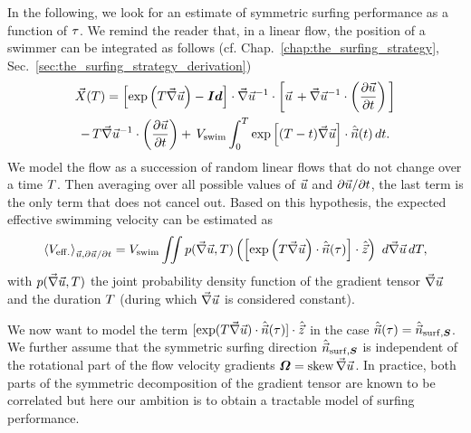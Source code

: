 In the following, we look for an estimate of symmetric surfing performance as a function of $\tau$.
We remind the reader that, in a linear flow, the position of a swimmer can be integrated as follows (cf. Chap.~\ref{chap:the_surfing_strategy}, Sec.~\ref{sec:the_surfing_strategy_derivation})
\begin{multline}
	\vec{X}(T) =
	\left[ \exp \left( T \vec{\nabla} \vec{u} \right) - \boldsymbol{Id} \right] \cdot \vec{\nabla} \vec{u}^{-1} \cdot \left[ \vec{u} \, + \vec{\nabla} \vec{u}^{-1} \cdot \left(\frac{\partial \vec{u}}{\partial t} \right) \, \right] \\
	- \, T \vec{\nabla} \vec{u}^{-1} \cdot \left(\frac{\partial \vec{u}}{\partial t} \right)
	+ \, V_{\mathrm{swim}} \int_{0}^{T} \exp \left[ (T - t) \vec{\nabla} \vec{u} \right] \cdot\hat{\vec{n}}(t) \, dt.
\end{multline}
We model the flow as a succession of random linear flows that do not change over a time $T$.
Then averaging over all possible values of $\vec{u}$ and $\partial \vec{u} / \partial t$, the last term is the only term that does not cancel out.
Based on this hypothesis, the expected effective swimming velocity can be estimated as
\begin{equation}\label{turb:eq:performance}
	\left\langle V_{\mathrm{eff.}} \right\rangle_{\vec{u}, \partial \vec{u} / \partial t} = V_{\mathrm{swim}} \iint p(\vec{\nabla} \vec{u}, T) \left( \left[ \exp \left( T \vec{\nabla} \vec{u} \right) \cdot \hat{\vec{n}}(\tau) \right] \cdot \hat{\vec{z}} \right) \,\, d \vec{\nabla} \vec{u} \, d T,
\end{equation}
with $p(\vec{\nabla} \vec{u}, T)$ the joint probability density function of the gradient tensor $\vec{\nabla} \vec{u}$ and the duration $T$ (during which $\vec{\nabla} \vec{u}$ is considered constant).

We now want to model the term $[ \exp ( T \vec{\nabla} \vec{u} ) \cdot \hat{\vec{n}}(\tau) ] \cdot \hat{\vec{z}}$ in the case $\hat{\vec{n}}(\tau) = \hat{\vec{n}}_{\mathrm{surf}, \boldsymbol{S}}$.
We further assume that the symmetric surfing direction $\hat{\vec{n}}_{\mathrm{surf}, \boldsymbol{S}}$ is independent of the rotational part of the flow velocity gradients $\boldsymbol{\varOmega} = \operatorname{skew} \vec{\nabla} \vec{u}$.
In practice, both parts of the symmetric decomposition of the gradient tensor are known to be correlated \citep{buaria2022vorticity} but here our ambition is to obtain a tractable model of surfing performance.

